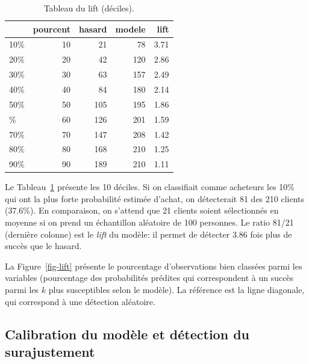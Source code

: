 \documentclass[
  11pt,
  letterpaper,
]{scrbook}
\theoremstyle{definition}
\theoremstyle{remark}
\begin{document}
\hypertarget{tbl-lift}{}
\begin{table}
\caption{\label{tbl-lift}Tableau du lift (déciles). }\tabularnewline

\centering
\begin{tabular}{lrrrr}
\toprule
  & pourcent & hasard & modele & lift\\
\midrule
10\% & 10 & 21 & 78 & 3.71\\
20\% & 20 & 42 & 120 & 2.86\\
30\% & 30 & 63 & 157 & 2.49\\
40\% & 40 & 84 & 180 & 2.14\\
50\% & 50 & 105 & 195 & 1.86\\
\addlinespace
60\% & 60 & 126 & 201 & 1.59\\
70\% & 70 & 147 & 208 & 1.42\\
80\% & 80 & 168 & 210 & 1.25\\
90\% & 90 & 189 & 210 & 1.11\\
\bottomrule
\end{tabular}
\end{table}

Le Tableau~\ref{tbl-lift} présente les 10 déciles. Si on classifiait
comme acheteurs les 10\% qui ont la plus forte probabilité estimée
d'achat, on détecterait 81 des 210 clients (37.6\%). En comparaison, on
s'attend que 21 clients soient sélectionnés en moyenne si on prend un
échantillon aléatoire de 100 personnes. Le ratio 81/21 (dernière
colonne) est le \emph{lift} du modèle: il permet de détecter 3.86 fois
plus de succès que le hasard.

La Figure~\ref{fig-lift} présente le pourcentage d'observations bien
classées parmi les variables (pourcentage des probabilités prédites qui
correspondent à un succès parmi les \(k\) plus susceptibles selon le
modèle). La référence est la ligne diagonale, qui correspond à une
détection aléatoire.

\hypertarget{calibration-du-moduxe8le-et-duxe9tection-du-surajustement}{%
\subsection{Calibration du modèle et détection du
surajustement}\label{calibration-du-moduxe8le-et-duxe9tection-du-surajustement}}
\end{document}
